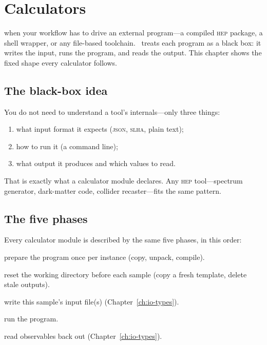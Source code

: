 \chapter{Calculators}
\label{ch:calculators}

 when your workflow has to drive an external program---a
compiled \textsc{hep} package, a shell wrapper, or any file-based toolchain. \Jarvis\ treats each
program as a black box: it writes the input, runs the program, and reads the output. This chapter
shows the fixed shape every calculator follows.

\section{The black-box idea}
\label{sec:calc-blackbox}

You do not need to understand a tool's internals---only three things:

\begin{enumerate}
  \item what input format it expects (\textsc{json}, \textsc{slha}, plain text);
  \item how to run it (a command line);
  \item what output it produces and which values to read.
\end{enumerate}

\noindent That is exactly what a calculator module declares. Any \textsc{hep} tool---spectrum
generator, dark-matter code, collider recaster---fits the same pattern.

\section{The five phases}
\label{sec:calc-phases}

Every calculator module is described by the same five phases, in this order:

\begin{description}[style=nextline, leftmargin=1.2em]
  \item[\yamlkey{installation}] prepare the program once per instance (copy, unpack, compile).
  \item[\yamlkey{initialization}] reset the working directory before each sample (copy a fresh
        template, delete stale outputs).
  \item[\yamlkey{execution.input}] write this sample's input file(s) (Chapter~\ref{ch:io-types}).
  \item[\yamlkey{execution.commands}] run the program.
  \item[\yamlkey{execution.output}] read observables back out (Chapter~\ref{ch:io-types}).
\end{description}

